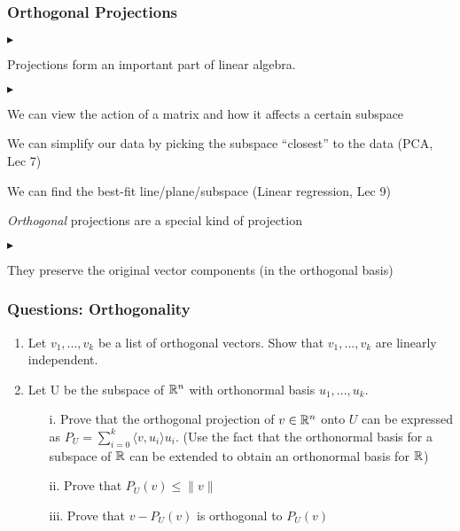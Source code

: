 \documentclass{beamer}
\renewenvironment{itemize}
\renewenvironment{enumerate}%
{\begin{list}{\arabic{enumi}.}%
      {\setlength{\leftmargin}{2.5em}%
       \setlength{\itemsep}{-\parsep}%
       \setlength{\topsep}{-\parskip}%
       \usecounter{enumi}}%
 }{\end{list}}
\renewenvironment{itemize}%
{\begin{list}{$\blacktriangleright$}%
      {\setlength{\leftmargin}{2.5em}%
       \setlength{\itemsep}{-\parsep}%
       \setlength{\topsep}{-\parskip}%
       \usecounter{enumi}}%
 }{\end{list}}
\begin{document}
\begin{frame}
\frametitle{Orthogonal Projections}
\begin{itemize}
\item Projections form an important part of linear algebra.
\begin{itemize}
\item We can view the action of a matrix and how it affects a certain subspace
\item We can simplify our data by picking the subspace ``closest'' to the data (PCA, Lec 7)
\item We can find the best-fit line/plane/subspace  (Linear regression, Lec 9)
\end{itemize}
\medskip
\item \textit{Orthogonal} projections are a special kind of projection
\begin{itemize}
\item They preserve the original vector components (in the orthogonal basis)

\end{itemize}
\end{itemize}

\end{frame}



\begin{frame}

\frametitle{Questions: Orthogonality}
\begin{enumerate}
\item Let $v_1,...,v_k$ be a list of orthogonal vectors. Show that $v_1,...,v_k$ are linearly independent.
\item Let U be the subspace of $\mathbb{R}^n$ with orthonormal basis $u_1,...,u_k$.
\begin{enumerate}
 \item[i.] Prove that the orthogonal projection of $v \in \mathbb{R}^n$ onto $U$ can be expressed as $P_U  = \sum_{i=0}^k  \langle v,u_i \rangle u_i$. (Use the fact that the orthonormal basis for a subspace of $\mathbb{R}$ can be extended to obtain an orthonormal basis for $\mathbb{R}$)
 \item[ii.] Prove that $P_U(v)\leq \|v\|$
 \item[iii.] Prove that $v-P_U(v)$ is orthogonal to $P_U(v)$
\end{enumerate}
\end{enumerate}
\end{frame}
\end{document}
